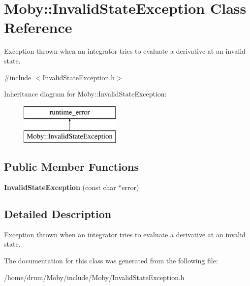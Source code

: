 \section{Moby\-:\-:Invalid\-State\-Exception Class Reference}
\label{classMoby_1_1InvalidStateException}


Exception thrown when an integrator tries to evaluate a derivative at an invalid state.  




{\ttfamily \#include $<$Invalid\-State\-Exception.\-h$>$}

Inheritance diagram for Moby\-:\-:Invalid\-State\-Exception\-:\begin{figure}[H]
\begin{center}
\leavevmode
\includegraphics[height=2.000000cm]{classMoby_1_1InvalidStateException}
\end{center}
\end{figure}
\subsection*{Public Member Functions}
\begin{DoxyCompactItemize}
\item 
{\bfseries Invalid\-State\-Exception} (const char $\ast$error)\label{classMoby_1_1InvalidStateException_ac486490708afd97dd3babf746cdefcf8}

\end{DoxyCompactItemize}


\subsection{Detailed Description}
Exception thrown when an integrator tries to evaluate a derivative at an invalid state. 

The documentation for this class was generated from the following file\-:\begin{DoxyCompactItemize}
\item 
/home/drum/\-Moby/include/\-Moby/Invalid\-State\-Exception.\-h\end{DoxyCompactItemize}
